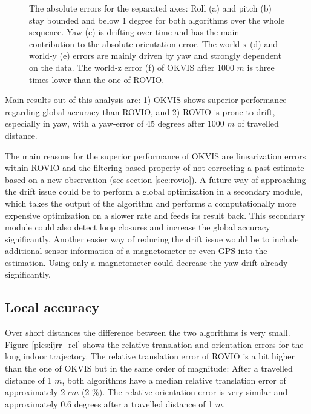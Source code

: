 \begin{figure}[h]
\begin{subfigure}[b]{0.48\textwidth}
    \caption{}
  \end{subfigure}
   \caption{The absolute errors for the separated axes: Roll (a) and pitch (b) stay bounded and below 1 degree for both algorithms over the whole sequence. Yaw (c) is drifting over time and has the main contribution to the absolute orientation error. The world-x (d) and world-y (e) errors are mainly driven by yaw and strongly dependent on the data. The world-z error (f) of OKVIS after 1000 $m$ is three times lower than the one of ROVIO.}
   \label{pics:ijrr_abs_separate}
\end{figure}

Main results out of this analysis are: 1) OKVIS shows superior performance regarding global accuracy than ROVIO, and 2) ROVIO is prone to drift, especially in yaw, with a yaw-error of 45 degrees after 1000 $m$ of travelled distance.

The main reasons for the superior performance of OKVIS are linearization errors within ROVIO and the filtering-based property of not correcting a past estimate based on a new observation (see section \ref{sec:rovio}). 
A future way of approaching the drift issue could be to perform a global optimization in a secondary module, which takes the output of the algorithm and performs a computationally more expensive optimization on a slower rate and feeds its result back. This secondary module could also detect loop closures and increase the global accuracy significantly. Another easier way of reducing the drift issue would be to include additional sensor information of a magnetometer or even GPS into the estimation. Using only a magnetometer could decrease the yaw-drift already significantly.


\subsection{Local accuracy}
\label{sec:ijrr_local}

Over short distances the difference between the two algorithms is very small. Figure \ref{pics:ijrr_rel} shows the relative translation and orientation errors for the long indoor trajectory. The relative translation error of ROVIO is a bit higher than the one of OKVIS but in the same order of magnitude: After a travelled distance of 1 $m$, both algorithms have a median relative translation error of approximately 2 $cm$ (2 $\%$). The relative orientation error is very similar and approximately 0.6 degrees after a travelled distance of 1 $m$.

